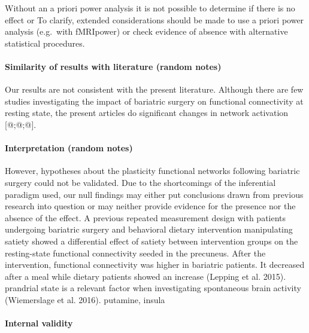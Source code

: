 \documentclass[
]{article}
\begin{document}
Without an a priori power analysis it is not possible to determine if there is no effect or
To clarify, extended considerations should be made to use a priori power analysis (e.g.~with fMRIpower) or check evidence of absence with alternative statistical procedures.

\hypertarget{similarity-of-results-with-literature-random-notes}{%
\paragraph{Similarity of results with literature (random notes)}\label{similarity-of-results-with-literature-random-notes}}

Our results are not consistent with the present literature. Although there are few studies investigating the impact of bariatric surgery on functional connectivity at resting state, the present articles do significant changes in network activation {[}@;@;@{]}.

\hypertarget{interpretation-random-notes}{%
\paragraph{Interpretation (random notes)}\label{interpretation-random-notes}}

However, hypotheses about the plasticity functional networks following bariatric surgery could not be validated. Due to the shortcomings of the inferential paradigm used, our null findings may either put conclusions drawn from previous research into question or may neither provide evidence for the presence nor the absence of the effect.
A previous repeated measurement design with patients undergoing bariatric surgery and behavioral dietary intervention manipulating satiety showed a differential effect of satiety between intervention groups on the resting-state functional connectivity seeded in the precuneus. After the intervention, functional connectivity was higher in bariatric patients. It decreased after a meal while dietary patients showed an increase (Lepping et al. 2015).
prandrial state is a relevant factor when investigating spontaneous brain activity (Wiemerslage et al. 2016). putamine, insula

\hypertarget{internal-validity}{%
\paragraph{Internal validity}\label{internal-validity}}
\end{document}

